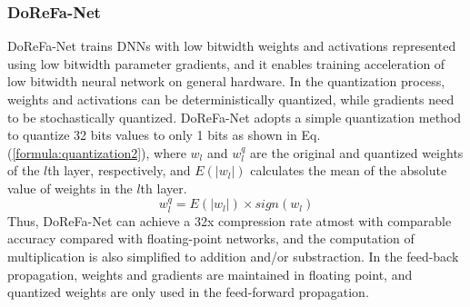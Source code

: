 \documentclass[10pt,twocolumn,letterpaper]{article}
\begin{document}

\vspace{-20pt}
\subsubsection{DoReFa-Net}
DoReFa-Net \cite{zhou2016dorefa} trains DNNs with low bitwidth weights and activations represented using low bitwidth parameter gradients, and it enables training acceleration of low bitwidth neural network on general hardware.
In the quantization process, weights and activations can be deterministically quantized, while gradients need to be stochastically quantized.
DoReFa-Net adopts a simple quantization method to quantize 32 bits values to only 1 bits as shown in Eq. (\ref{formula:quantization2}), where $w_l$ and $w^q_l$ are the original and quantized weights of the $l$th layer, respectively, and $E(|w_l|)$ calculates the mean of the absolute value of weights in the $l$th layer.
{%
\begin{equation}\label{formula:quantization2}
w^q_l=E(|w_l|)\times sign(w_l)
\end{equation}
}
Thus, DoReFa-Net can achieve a 32x compression rate atmost with comparable accuracy compared with floating-point networks, and the computation of multiplication is also simplified to addition and/or substraction.
In the feed-back propagation, weights and gradients are maintained in floating point, and quantized weights are only used in the feed-forward propagation.
\end{document}
